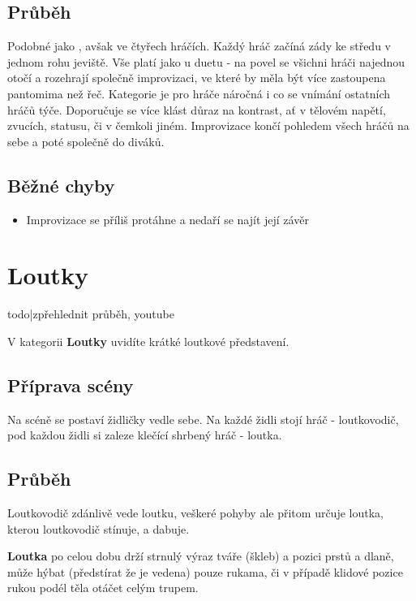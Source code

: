 \documentclass[main.tex]{subfiles}
\begin{document}
 
\subsection{Průběh}  
Podobné jako , avšak ve čtyřech hráčích. Každý hráč začíná zády ke středu v jednom rohu jeviště. Vše platí jako u duetu - na povel  se všichni hráči najednou otočí a rozehrají společně improvizaci, ve které by měla být více zastoupena pantomima než řeč. Kategorie je pro hráče náročná i co se vnímání ostatních hráčů týče. Doporučuje se více klást důraz na kontrast, ať v tělovém napětí, zvucích, statusu, či v čemkoli jiném. Improvizace končí pohledem všech hráčů na sebe a poté společně do diváků. 
 
\subsection{ Běžné chyby } \begin{itemize}
\item Improvizace se příliš protáhne a nedaří se najít její závěr
\end{itemize}
 
 
 
\needspace{5cm} \section{Loutky} \label{loutky} {{todo|zpřehlednit průběh, youtube}} 
 
 
V kategorii \textbf{Loutky}{}  uvidíte krátké loutkové představení. 
 
\subsection{Příprava scény} Na scéně se postaví židličky vedle sebe. Na každé židli stojí hráč - loutkovodič, pod každou židli si zaleze klečící shrbený hráč - loutka. 
 
\subsection{Průběh} Loutkovodič zdánlivě vede loutku, veškeré pohyby ale přitom určuje loutka, kterou loutkovodič stínuje, a dabuje. 
 
\textbf{Loutka}{} po celou dobu drží strnulý výraz tváře (škleb) a pozici prstů a dlaně, může hýbat (předstírat že je vedena) pouze rukama, či v případě klidové pozice rukou podél těla otáčet celým trupem. 
 
\end{document}

